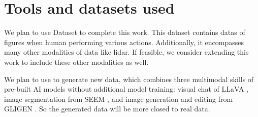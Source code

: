\documentclass[a4paper,11pt]{scrartcl}
\begin{document}
\section{Tools and datasets used}
We plan to use Dataset \cite{yang2023mm} to complete this work. This dataset contains datas of figures when human performing various actions. Additionally, it encompasses many other modalities of data like lidar.
If feasible, we consider extending this work to include these other modalities as well.

We plan to use \cite{chen2023llava} to generate new data, which combines three multimodal skills of pre-built AI models
without additional model training: visual chat of LLaVA , image segmentation
from SEEM , and image generation and editing from GLIGEN . So the generated data will be more closed to real data.


\end{document}

